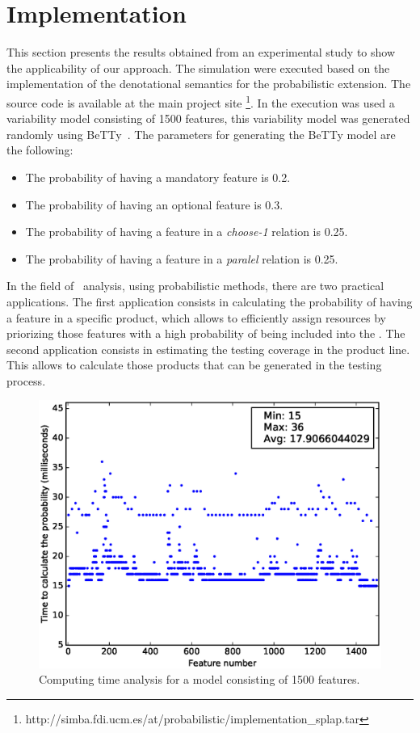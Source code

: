 
\section{Implementation}
\label{sec:stat:impl}

This section presents the results obtained from an experimental study to show the applicability of our 
approach. The simulation were executed based on the implementation of the denotational 
semantics for the probabilistic extension. The source code is available at the main project site 
\footnote{http://simba.fdi.ucm.es/at/probabilistic/implementation\_splap.tar}. In the
execution was used a variability model consisting of 1500 features, this variability model
was generated randomly using BeTTy~\cite{SeguraHBC11}. The parameters for 
generating the BeTTy model are the following:

\begin{itemize}
	\item The probability of having a mandatory feature is 0.2.
	\item The probability of having an optional feature is 0.3.
	\item The probability of having a feature in a \emph{choose-1} relation is 0.25.
	\item The probability of having a feature in a \emph{paralel} relation is 0.25.
\end{itemize}

In the field of \SPLs\ analysis, using probabilistic methods, there are two practical applications. The first
application consists in calculating the probability of having a feature in a specific product, which allows to 
efficiently assign resources by priorizing those features with a high probability of being included into 
the \SPL. The second application consists in estimating the testing coverage in the product line. This 
allows to calculate those products that can be generated in the testing process.

\begin{figure}[h]
	\centering
	\linefigure
	\includegraphics[width=0.8\hsize,angle=0]{plot_probs_times.eps}
	\linefigure
	\caption{Computing time analysis for a model consisting of 1500 features.}\label{fig:plot:probs:times}
\end{figure}

